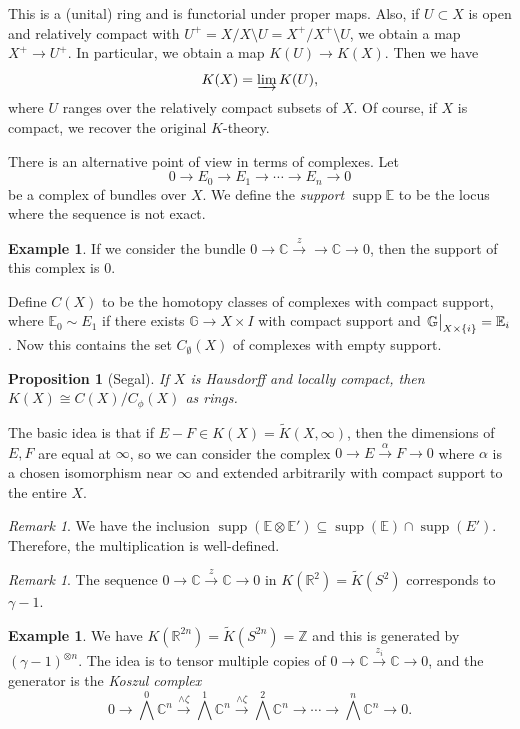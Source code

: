 \documentclass[leqno, openany]{memoir}
\newtheorem{prop}[thm]{Proposition}
\theoremstyle{definition}
\newtheorem{exm}[thm]{Example}
\theoremstyle{remark}
\newtheorem{rmk}[thm]{Remark}
\theoremstyle{plain}
\theoremstyle{definition}
\theoremstyle{remark}
\newcommand{\R}{\mathbb{R}}
\newcommand{\C}{\mathbb{C}}
\newcommand{\E}{\mathbb{E}}
\newcommand{\Z}{\mathbb{Z}}
\newcommand{\wt}[1]{\widetilde{#1}}
\DeclareMathOperator{\supp}{supp}
\begin{document}
This is a (unital) ring and is functorial under proper maps. Also, if $U \subset X$ is open and relatively compact with $U^+ = X / X \setminus U = X^+ / X^+ \setminus U$, we obtain a map $X^+ \to U^+$. In particular, we obtain a map $K(U) \to K(X)$. Then we have
\[ K(X) = \varinjlim K(U), \]
where $U$ ranges over the relatively compact subsets of $X$. Of course, if $X$ is compact, we recover the original $K$-theory.

There is an alternative point of view in terms of complexes. Let
\[ 0 \to E_0 \to E_1 \to \cdots \to E_n \to 0 \]
be a complex of bundles over $X$. We define the \textit{support} $\supp \mathbb{E}$ to be the locus where the sequence is not exact.

\begin{exm}
    If we consider the bundle $0 \to \C \xrightarrow{z} \to \C \to 0$, then the support of this complex is $\qty{0}$.
\end{exm}

Define $C(X)$ to be the homotopy classes of complexes with compact support, where $\E_0 \sim E_1$ if there exists $\mathbb{G} \to X \times I$ with compact support and $\eval{\mathbb{G}}_{X \times \qty{i}} = \E_i$. Now this contains the set $C_{\emptyset}(X)$ of complexes with empty support. 

\begin{prop}[Segal]
    If $X$ is Hausdorff and locally compact, then $K(X) \cong C(X) / C_{\phi}(X)$ as rings.
\end{prop}

The basic idea is that if $E - F \in K(X) = \wt{K}(X, \infty)$, then the dimensions of $E, F$ are equal at $\infty$, so we can consider the complex $0 \to E \xrightarrow{\alpha} F \to 0$ where $\alpha$ is a chosen isomorphism near $\infty$ and extended arbitrarily with compact support to the entire $X$.

\begin{rmk}
    We have the inclusion $\supp(\E \otimes \E') \subseteq \supp(\E) \cap \supp(E')$. Therefore, the multiplication is well-defined.
\end{rmk}

\begin{rmk}
    The sequence $0 \to \C \xrightarrow{z} \C \to 0$ in $K(\R^2) = \wt{K}(S^2)$ corresponds to $\gamma - 1$.
\end{rmk}

\begin{exm}
    We have $K(\R^{2n}) = \wt{K}(S^{2n}) = \Z$ and this is generated by ${(\gamma-1)}^{\otimes n}$. The idea is to tensor multiple copies of $0 \to \C \xrightarrow{z_i} \C \to 0$, and the generator is the \textit{Koszul complex}
    \[ 0 \to {\bigwedge}^0 \C^n \xrightarrow{\wedge \zeta} {\bigwedge}^1 \C^n \xrightarrow{\wedge \zeta} {\bigwedge}^2 \C^n \to \cdots \to {\bigwedge}^n \C^n \to 0. \]
\end{exm}
\end{document}
